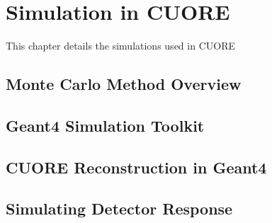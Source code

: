 \chapter{Simulation in CUORE}

This chapter details the simulations used in CUORE

\section{Monte Carlo Method Overview}

\section{Geant4 Simulation Toolkit}

\section{CUORE Reconstruction in Geant4}

\section{Simulating Detector Response}